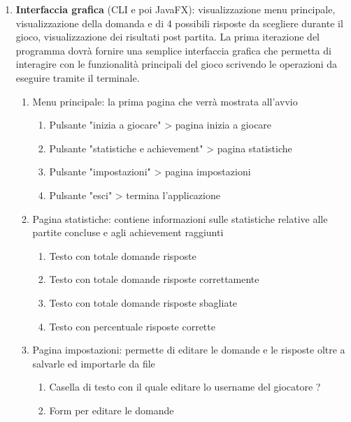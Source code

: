 \begin{enumerate}
            \item \textbf{Interfaccia grafica} (CLI e poi JavaFX): visualizzazione menu principale, visualizzazione della domanda e di 4 possibili risposte da scegliere durante il gioco, visualizzazione dei risultati post partita. La prima iterazione del programma dovrà fornire una semplice interfaccia grafica che permetta di interagire con le funzionalità principali del gioco scrivendo le operazioni da eseguire tramite il terminale.
                \begin{enumerate}
                    \item Menu principale: la prima pagina che verrà mostrata all'avvio
                        \begin{enumerate}
                            \item Pulsante "inizia a giocare" > pagina inizia a giocare
                            \item Pulsante "statistiche e achievement" > pagina statistiche
                            \item Pulsante "impostazioni" > pagina impostazioni
                            \item Pulsante "esci" > termina l'applicazione
                        \end{enumerate}
                    \item Pagina statistiche: contiene informazioni sulle statistiche relative alle partite concluse e agli achievement raggiunti
                        \begin{enumerate}
                            \item Testo con totale domande risposte
                            \item Testo con totale domande risposte correttamente
                            \item Testo con totale domande risposte sbagliate
                            \item Testo con percentuale risposte corrette
                        \end{enumerate}
                    \item Pagina impostazioni: permette di editare le domande e le risposte oltre a salvarle ed importarle da file
                        \begin{enumerate}
                            \item Casella di testo con il quale editare lo username del giocatore ?
                            \item Form per editare le domande

\end{enumerate}
\end{enumerate}
\end{enumerate}
